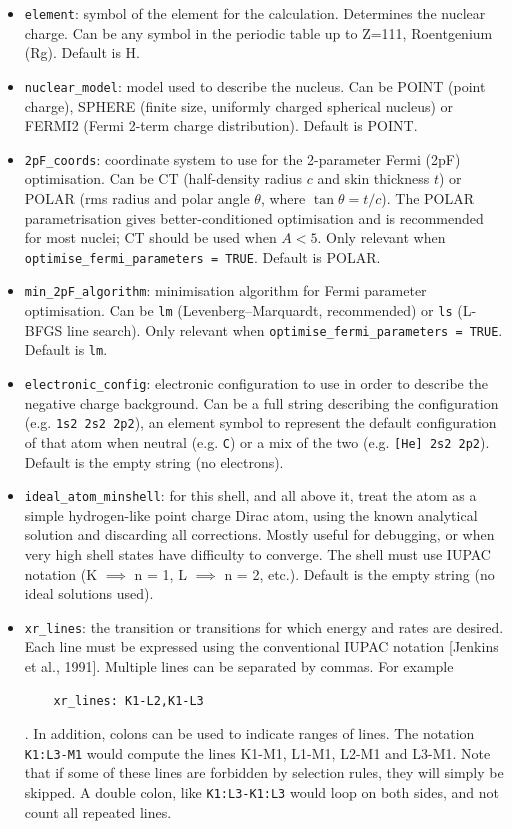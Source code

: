 \documentclass[]{article}
\begin{document}
\begin{itemize}
	\item \texttt{element}: symbol of the element for the calculation. Determines the nuclear charge. Can be any symbol in the periodic table up to Z=111, Roentgenium (Rg). Default is H.
	\item \texttt{nuclear\_model}: model used to describe the nucleus. Can be POINT (point charge), SPHERE (finite size, uniformly charged spherical nucleus) or FERMI2 (Fermi 2-term charge distribution). Default is POINT.
	\item \texttt{2pF\_coords}: coordinate system to use for the 2-parameter Fermi (2pF) optimisation. Can be CT (half-density radius $c$ and skin thickness $t$) or POLAR (rms radius and polar angle $\theta$, where $\tan\theta = t/c$). The POLAR parametrisation gives better-conditioned optimisation and is recommended for most nuclei; CT should be used when $A < 5$. Only relevant when \texttt{optimise\_fermi\_parameters = TRUE}. Default is POLAR.
	\item \texttt{min\_2pF\_algorithm}: minimisation algorithm for Fermi parameter optimisation. Can be \texttt{lm} (Levenberg--Marquardt, recommended) or \texttt{ls} (L-BFGS line search). Only relevant when \texttt{optimise\_fermi\_parameters = TRUE}. Default is \texttt{lm}.
	\item \texttt{electronic\_config}: electronic configuration to use in order to describe the negative charge background. Can be a full string describing the configuration (e.g. \texttt{1s2 2s2 2p2}), an element symbol to represent the default configuration of that atom when neutral (e.g. \texttt{C}) or a mix of the two (e.g. \texttt{[He] 2s2 2p2}). Default is the empty string (no electrons).
	\item \texttt{ideal\_atom\_minshell}: for this shell, and all above it, treat the atom as a simple hydrogen-like point charge Dirac atom, using the known analytical solution and discarding all corrections. Mostly useful for debugging, or when very high shell states have difficulty to converge. The shell must use IUPAC notation (K $\implies$ n = 1, L $\implies$ n = 2, etc.). Default is the empty string (no ideal solutions used).
	\item \texttt{xr\_lines}: the transition or transitions for which energy and rates are desired. Each line must be expressed using the conventional IUPAC notation [Jenkins et al., 1991]. Multiple lines can be separated by commas. For example
	
	\begin{verbatim}
	xr_lines: K1-L2,K1-L3
	\end{verbatim}
	
	. In addition, colons can be used to indicate ranges of lines. The notation \texttt{K1:L3-M1} would compute the lines K1-M1, L1-M1, L2-M1 and L3-M1. Note that if some of these lines are forbidden by selection rules, they will simply be skipped. A double colon, like \texttt{K1:L3-K1:L3} would loop on both sides, and not count all repeated lines. 
	
\end{itemize}
\end{document}
